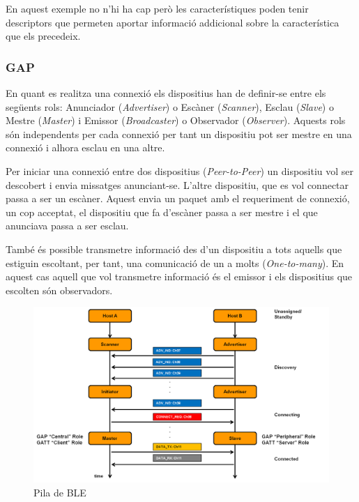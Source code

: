 En aquest exemple no n'hi ha cap però les característiques poden tenir descriptors \cite{descriptors} que permeten aportar informació addicional sobre la característica que els precedeix.

\subsubsection{GAP}
En quant es realitza una connexió els dispositius han de definir-se entre els següents rols: Anunciador (\textit{Advertiser}) o Escàner (\textit{Scanner}), Esclau (\textit{Slave}) o Mestre (\textit{Master}) i Emissor (\textit{Broadcaster}) o Observador (\textit{Observer}).
Aquests rols són independents per cada connexió per tant un dispositiu pot ser mestre en una connexió i alhora esclau en una altre.

Per iniciar una connexió entre dos dispositius (\textit{Peer-to-Peer}) un dispositiu vol ser descobert i envia missatges anunciant-se. L'altre dispositiu, que es vol connectar passa a ser un escàner. Aquest envia un paquet amb el requeriment de connexió, un cop acceptat, el dispositiu que fa d'escàner passa a ser mestre i el que anunciava passa a ser esclau.

També és possible transmetre informació des d'un dispositiu a tots aquells que estiguin escoltant, per tant, una comunicació de un a molts (\textit{One-to-many}). En aquest cas aquell que vol transmetre informació és el emissor i els dispositius que escolten són observadors.

\begin{figure}[h]
	\begin{center}
		\includegraphics[width=1\textwidth]{./images/rols_unicast.png}
		\caption{Pila de BLE \cite{ble_stack}}
		\label{ble_stack}
	\end{center}
\end{figure}

